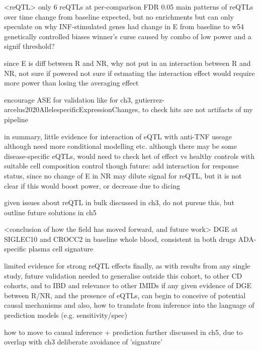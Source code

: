 \begin{outline}
\1 <reQTL>
    \2 only 6 reQTLs at per-comparison FDR 0.05
     main patterns of reQTLs over time
    \2 change from baseline expected, but no enrichments
    \2 but can only speculate on why INF-stimulated genes had change in E from baseline to w54 genetically controlled
    \2 biases
        \3 winner's curse caused by combo of low power and a signif threshold?

since E is diff between R and NR, 
why not put in an interaction between R and NR, not sure if powered
not sure if estmating the interaction effect would require more power
than losing the averaging effect

    \2 encourage ASE for validation like for ch3, gutierrez-arcelus2020AllelespecificExpressionChanges, to check hits are not artifacts of my pipeline

    \2 in summary, little evidence for interaction of eQTL with anti-TNF useage
        \3 although need more conditional modelling etc.
        \3 although there may be some disease-specific eQTLs, would need to check het of effect vs healthy controls with suitable cell composition control though
        \3 future: add interaction for response status, since no change of E in NR may dilute signal for reQTL, but it is not clear if this would boost power, or decrease due to dicing

    \2 given issues about reQTL in bulk discussed in ch3, do not pursue this, but outline future solutions in ch5


\1 <conclusion of how the field has moved forward, and future work>
    \2 DGE at SIGLEC10 and CROCC2 in baseline whole blood, consistent in both drugs
    \2 ADA-specific plasma cell signature

    \2 limited evidence for strong reQTL effects
    \2 finally, as with results from any single study, future validation needed to generalise outside this cohort, to other CD cohorts, and to IBD and relevance to other IMIDs if any
    \2 given evidence of DGE between R/NR, and the presence of eQTLs, can begin to conceive of potential causal mechanisms 
    \2 and also, how to translate from inference into the language of prediction models (e.g. sensitivity/spec)

\1 how to move to causal inference + prediction further discussed in ch5, due to overlap with ch3
    \2 deliberate avoidance of 'signature'


\end{outline}
